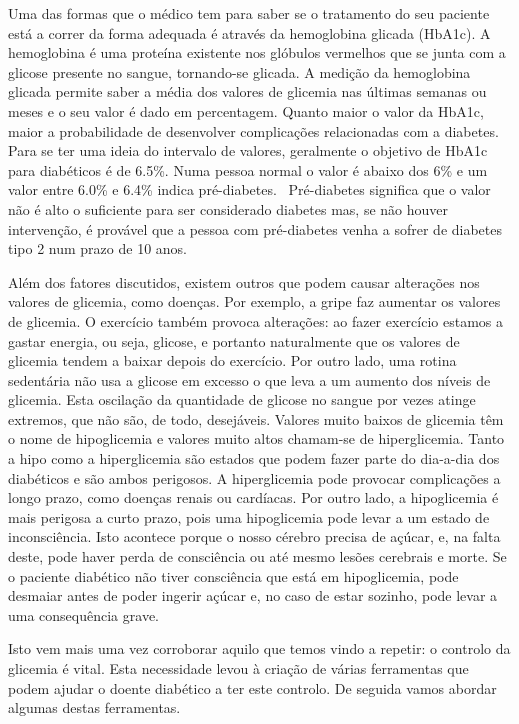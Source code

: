Uma das formas que o médico tem para saber se o tratamento do seu paciente está a correr da forma adequada é através da hemoglobina glicada (HbA1c). A hemoglobina é uma proteína existente nos glóbulos vermelhos que se junta com a glicose presente no sangue, tornando-se glicada. A medição da hemoglobina glicada permite saber a média dos valores de glicemia nas últimas semanas ou meses e o seu valor é dado em percentagem. Quanto maior o valor da HbA1c, maior a probabilidade de desenvolver complicações relacionadas com a diabetes.
Para se ter uma ideia do intervalo de valores, geralmente o objetivo de HbA1c para diabéticos é de 6.5\%. Numa pessoa normal o valor é abaixo dos 6\% e um valor entre 6.0\% e 6.4\% indica pré-diabetes.~\cite{hba1c} Pré-diabetes significa que o valor não é alto o suficiente para ser considerado diabetes mas, se não houver intervenção, é provável que a pessoa com pré-diabetes venha a sofrer de diabetes tipo 2 num prazo de 10 anos.~\cite{prediabetes}

Além dos fatores discutidos, existem outros que podem causar alterações nos valores de glicemia, como doenças. Por exemplo, a gripe faz aumentar os valores de glicemia. O exercício também provoca alterações: ao fazer exercício estamos a gastar energia, ou seja, glicose, e portanto naturalmente que os valores de glicemia tendem a baixar depois do exercício. Por outro lado, uma rotina sedentária não usa a glicose em excesso o que leva a um aumento dos níveis de glicemia. Esta oscilação da quantidade de glicose no sangue por vezes atinge extremos, que não são, de todo, desejáveis. Valores muito baixos de glicemia têm o nome de hipoglicemia e valores muito altos chamam-se de hiperglicemia.
Tanto a hipo como a hiperglicemia são estados que podem fazer parte do dia-a-dia dos diabéticos e são ambos perigosos.  A hiperglicemia pode provocar complicações a longo prazo, como doenças renais ou cardíacas. Por outro lado, a hipoglicemia é mais perigosa a curto prazo, pois uma hipoglicemia pode levar a um estado de inconsciência. Isto acontece porque o nosso cérebro precisa de açúcar, e, na falta deste, pode haver perda de consciência ou até mesmo lesões cerebrais e morte. Se o paciente diabético não tiver consciência que está em hipoglicemia, pode desmaiar antes de poder ingerir açúcar e, no caso de estar sozinho, pode levar a uma consequência grave.

Isto vem mais uma vez corroborar aquilo que temos vindo a repetir: o controlo da glicemia é vital. Esta necessidade levou à criação de várias ferramentas que podem ajudar o doente diabético a ter este controlo. De seguida vamos abordar algumas destas ferramentas.


